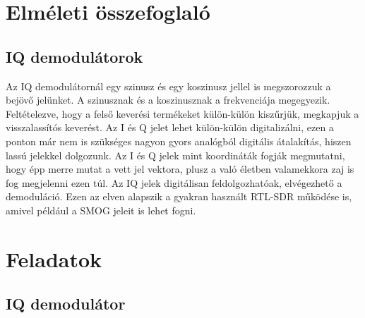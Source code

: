 \documentclass[12pt,a4paper]{article}
\begin{document}
\section{Elméleti összefoglaló}


\subsection{IQ demodulátorok}
Az IQ demodulátornál egy szinusz és egy koszinusz jellel is megszorozzuk a bejövő jelünket. A szinusznak és a koszinusznak a frekvenciája megegyezik. Feltételezve, hogy a felső keverési termékeket külön-külön kiszűrjük, megkapjuk a visszalassítós keverést. Az I és Q jelet lehet külön-külön digitalizálni, ezen a ponton már nem is szükséges nagyon gyors analógból digitális átalakítás, hiszen lassú jelekkel dolgozunk. Az I és Q jelek mint koordináták fogják megmutatni, hogy épp merre mutat a vett jel vektora, plusz a való életben valamekkora zaj is fog megjelenni ezen túl. Az IQ jelek digitálisan feldolgozhatóak, elvégezhető a demoduláció. Ezen az elven alapszik a gyakran használt RTL-SDR működése is, amivel például a SMOG jeleit is lehet fogni.

\clearpage
\section{Feladatok}

\subsection{IQ demodulátor}
\end{document}
